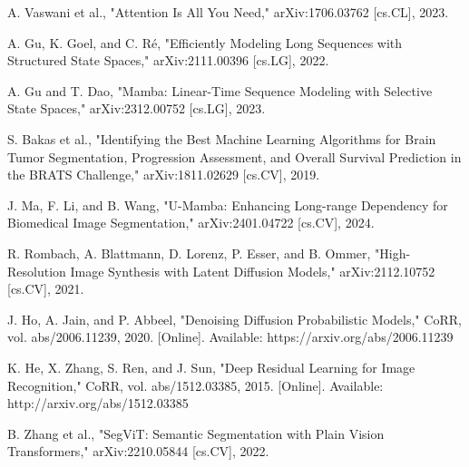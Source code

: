 \documentclass[conference]{IEEEtran}
\begin{document}
\begin{thebibliography}{00}
     A. Vaswani et al., "Attention Is All You Need," arXiv:1706.03762 [cs.CL], 2023.

     A. Gu, K. Goel, and C. Ré, "Efficiently Modeling Long Sequences with Structured State Spaces," arXiv:2111.00396 [cs.LG], 2022.

     A. Gu and T. Dao, "Mamba: Linear-Time Sequence Modeling with Selective State Spaces," arXiv:2312.00752 [cs.LG], 2023.

     S. Bakas et al., "Identifying the Best Machine Learning Algorithms for Brain Tumor Segmentation, Progression Assessment, and Overall Survival Prediction in the BRATS Challenge," arXiv:1811.02629 [cs.CV], 2019.

     J. Ma, F. Li, and B. Wang, "U-Mamba: Enhancing Long-range Dependency for Biomedical Image Segmentation," arXiv:2401.04722 [cs.CV], 2024.

     R. Rombach, A. Blattmann, D. Lorenz, P. Esser, and B. Ommer, "High-Resolution Image Synthesis with Latent Diffusion Models," arXiv:2112.10752 [cs.CV], 2021.

     J. Ho, A. Jain, and P. Abbeel, "Denoising Diffusion Probabilistic Models," CoRR, vol. abs/2006.11239, 2020. [Online]. Available: https://arxiv.org/abs/2006.11239

     K. He, X. Zhang, S. Ren, and J. Sun, "Deep Residual Learning for Image Recognition," CoRR, vol. abs/1512.03385, 2015. [Online]. Available: http://arxiv.org/abs/1512.03385

     B. Zhang et al., "SegViT: Semantic Segmentation with Plain Vision Transformers," arXiv:2210.05844 [cs.CV], 2022.


\end{thebibliography}
\end{document}
